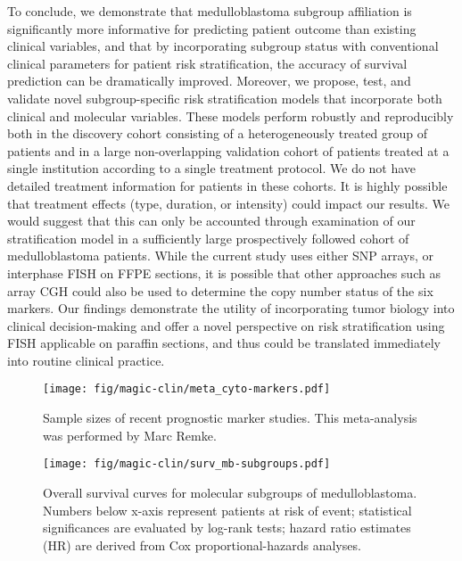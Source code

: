 \documentclass[11pt,letterpaper]{article}
\theoremstyle{definition}
\begin{document}
To conclude, we demonstrate that medulloblastoma subgroup affiliation is significantly more informative for predicting patient outcome than existing clinical variables, and that by incorporating subgroup status with conventional clinical parameters for patient risk stratification, the accuracy of survival prediction can be dramatically improved.  Moreover, we propose, test, and validate novel subgroup-specific risk stratification models that incorporate both clinical and molecular variables.  These models perform robustly and reproducibly both in the discovery cohort consisting of a heterogeneously treated group of patients and in a large non-overlapping validation cohort of patients treated at a single institution according to a single treatment protocol.  We do not have detailed treatment information for patients in these cohorts.  It is highly possible that treatment effects (type, duration, or intensity) could impact our results.  We would suggest that this can only be accounted through examination of our stratification model in a sufficiently large prospectively followed cohort of medulloblastoma patients.  While the current study uses either SNP arrays, or interphase FISH on FFPE sections, it is possible that other approaches such as array CGH could also be used to determine the copy number status of the six markers.  Our findings demonstrate the utility of incorporating tumor biology into clinical decision-making and offer a novel perspective on risk stratification using FISH applicable on paraffin sections, and thus could be translated immediately into routine clinical practice.


\clearpage

\begin{SCfigure}
	\texttt{[image: fig/magic-clin/meta\_cyto-markers.pdf]}
	\caption[Sample sizes of recent prognostic marker studies]
	{
	Sample sizes of recent prognostic marker studies.
	This meta-analysis was performed by Marc Remke.
	}
	\label{fig:meta_cyto-markers}
\end{SCfigure}

\begin{SCfigure}
	\texttt{[image: fig/magic-clin/surv\_mb-subgroups.pdf]}
	\caption[Overall survival curves for molecular subgroups of medulloblastoma]
	{
	Overall survival curves for molecular subgroups of medulloblastoma.
	Numbers below x-axis represent patients at risk of event; statistical significances are evaluated by log-rank tests; hazard ratio estimates (HR) are derived from Cox proportional-hazards analyses.
	}
	\label{fig:surv_mb-subgroups}
\end{SCfigure}
\end{document}
